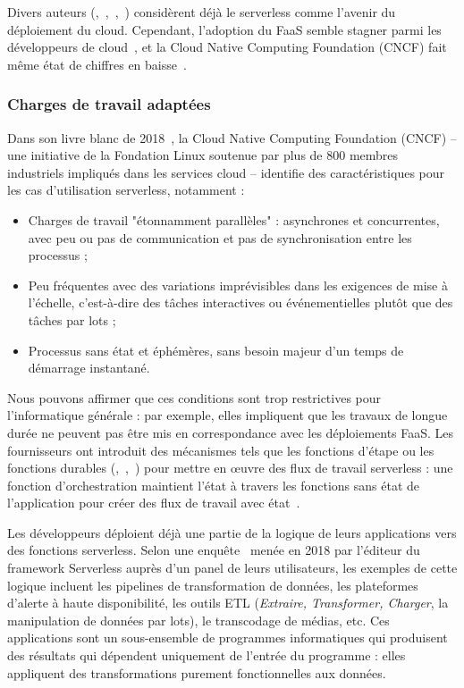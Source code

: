 Divers auteurs (\cite{hellersteinServerlessComputingOne2019},~\cite{vaneykSPECRGCloud2018},~\cite{shafieiServerlessComputingSurvey2021},~\cite{khandelwalTaureauDeconstructingServerless2020}) considèrent déjà le serverless comme l'avenir du déploiement du cloud. Cependant, l'adoption du FaaS semble stagner parmi les développeurs de cloud~\cite{oreilly2020adoption}, et la Cloud Native Computing Foundation (CNCF) fait même état de chiffres en baisse~\cite{cncf2021report}.

\subsubsection{Charges de travail adaptées}

Dans son livre blanc de 2018~\cite{cncf2018whitepaper}, la Cloud Native Computing Foundation (CNCF) -- une initiative de la Fondation Linux soutenue par plus de 800 membres industriels impliqués dans les services cloud -- identifie des caractéristiques pour les cas d'utilisation serverless, notamment :

\begin{itemize}
    \item Charges de travail "étonnamment parallèles" : asynchrones et concurrentes, avec peu ou pas de communication et pas de synchronisation entre les processus ;
    \item Peu fréquentes avec des variations imprévisibles dans les exigences de mise à l'échelle, c'est-à-dire des tâches interactives ou événementielles plutôt que des tâches par lots ;
    \item Processus sans état et éphémères, sans besoin majeur d'un temps de démarrage instantané.
\end{itemize}

Nous pouvons affirmer que ces conditions sont trop restrictives pour l'informatique générale : par exemple, elles impliquent que les travaux de longue durée ne peuvent pas être mis en correspondance avec les déploiements FaaS. Les fournisseurs ont introduit des mécanismes tels que les fonctions d'étape ou les fonctions durables (\cite{aws-step-functions},~\cite{azure-durable-functions},~\cite{google-workflows}) pour mettre en œuvre des flux de travail serverless : une fonction d'orchestration maintient l'état à travers les fonctions sans état de l'application pour créer des flux de travail avec état~\cite{burckhardtNetheriteEfficientExecution}.

Les développeurs déploient déjà une partie de la logique de leurs applications vers des fonctions serverless. Selon une enquête~\cite{serverless2018survey} menée en 2018 par l'éditeur du framework Serverless auprès d'un panel de leurs utilisateurs, les exemples de cette logique incluent les pipelines de transformation de données, les plateformes d'alerte à haute disponibilité, les outils ETL (\textit{Extraire, Transformer, Charger}, la manipulation de données par lots), le transcodage de médias, etc. Ces applications sont un sous-ensemble de programmes informatiques qui produisent des résultats qui dépendent uniquement de l'entrée du programme : elles appliquent des transformations purement fonctionnelles aux données.

